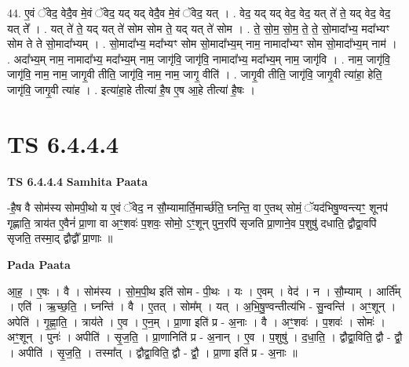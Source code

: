 \documentclass[17pt]{extarticle}
\begin{document}
44. ए॒वं ॅवेद॒ वेदै॒व मे॒वं ॅवेद॒ यद् यद् वेदै॒व मे॒वं ॅवेद॒ यत् । . वेद॒ यद् यद् वेद॒ वेद॒ यत् ते॑ ते॒ यद् वेद॒ वेद॒ यत् ते᳚ । . यत् ते॑ ते॒ यद् यत् ते॑ सोम सोम ते॒ यद् यत् ते॑ सोम । . ते॒ सो॒म॒ सो॒म॒ ते॒ ते॒ सो॒मादा᳚भ्य॒ मदा᳚भ्यꣳ सोम ते ते सो॒मादा᳚भ्यम् । . सो॒मादा᳚भ्य॒ मदा᳚भ्यꣳ सोम सो॒मादा᳚भ्य॒म् नाम॒ नामादा᳚भ्यꣳ सोम सो॒मादा᳚भ्य॒म् नाम॑ । . अदा᳚भ्य॒म् नाम॒ नामादा᳚भ्य॒ मदा᳚भ्य॒म् नाम॒ जागृ॑वि॒ जागृ॑वि॒ नामादा᳚भ्य॒ मदा᳚भ्य॒म् नाम॒ जागृ॑वि । . नाम॒ जागृ॑वि॒ जागृ॑वि॒ नाम॒ नाम॒ जागृ॒वी तीति॒ जागृ॑वि॒ नाम॒ नाम॒ जागृ॒ वीति॑ । . जागृ॒वी तीति॒ जागृ॑वि॒ जागृ॒वी त्या॑हा॒ हेति॒ जागृ॑वि॒ जागृ॒वी त्या॑ह । . इत्या॑हा॒हे तीत्या॑ है॒ष ए॒ष आ॒हे तीत्या॑ है॒षः । \newline
\pagebreak
{}

\section{ TS 6.4.4.4 }

\textbf{TS 6.4.4.4 } \newline
\textbf{Samhita Paata} \newline

-है॒ष वै सोम॑स्य सोमपी॒थो य ए॒वं ॅवेद॒ न सौ॒म्यामार्ति॒मार्च्छ॑ति॒ घ्नन्ति॒ वा ए॒तथ् सोमं॒ ॅयद॑भिषु॒ण्वन्त्यꣳ॒॒ शूनप॑ गृह्णाति॒ त्राय॑त ए॒वैनं॑ प्रा॒णा वा अꣳ॒॒शवः॑ प॒शवः॒ सोमो॒ ऽꣳ॒शून् पुन॒रपि॑ सृजति प्रा॒णाने॒व प॒शुषु॑ दधाति॒ द्वौद्वा॒वपि॑ सृजति॒ तस्मा॒द् द्वौद्वौ᳚ प्रा॒णाः ॥ \newline

\textbf{Pada Paata} \newline

आ॒ह॒ । ए॒षः । वै । सोम॑स्य । सो॒म॒पी॒थ इति॑ सोम - पी॒थः । यः । ए॒वम् । वेद॑ । न । सौ॒म्याम् । आर्ति᳚म् । एति॑ । ऋ॒च्छ॒ति॒ । घ्नन्ति॑ । वै । ए॒तत् । सोम᳚म् । यत् । अ॒भि॒षु॒ण्वन्तीत्य॑भि - सु॒न्वन्ति॑ । अꣳ॒॒शून् । अपेति॑ । गृ॒ह्णा॒ति॒ । त्राय॑ते । ए॒व । ए॒न॒म् । प्रा॒णा इति॑ प्र - अ॒नाः । वै । अꣳ॒॒शवः॑ । प॒शवः॑ । सोमः॑ । अꣳ॒॒शून् । पुनः॑ । अपीति॑ । सृ॒ज॒ति॒ । प्रा॒णानिति॑ प्र - अ॒नान् । ए॒व । प॒शुषु॑ । द॒धा॒ति॒ । द्वौद्वा॒विति॒ द्वौ - द्वौ॒ । अपीति॑ । सृ॒ज॒ति॒ । तस्मा᳚त् । द्वौद्वा॒विति॒ द्वौ - द्वौ॒ । प्रा॒णा इति॑ प्र - अ॒नाः ॥  \newline
\end{document}
